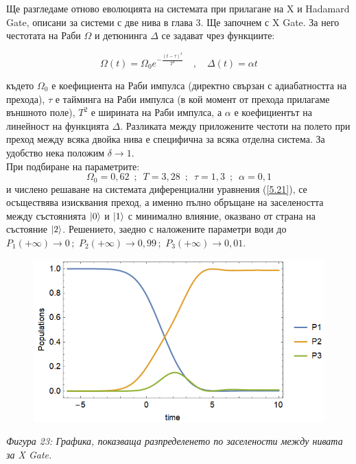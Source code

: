     Ще разгледаме отново еволюцията на системата при прилагане на X и Hadamard Gate, описани за системи с две нива в глава 3. Ще започнем с X Gate. За него честотата на Раби $\Omega$ и
    детюнинга $\Delta$ се задават чрез функциите:

    \begin{equation} \label{5.22}
        \Omega(t) = \Omega_0 e^{-\frac{(t-\tau)^2}{T^2}} \quad , \quad \Delta(t) = \alpha t
    \end{equation}

    където $\Omega_0$ е коефициента на Раби импулса (директно свързан с адиабатността на прехода), $\tau$ е тайминга на Раби импулса (в кой момент от прехода прилагаме
    външното поле), $T^2$ е ширината на Раби импулса, а $\alpha$ е коефициентът на линейност на функцията $\Delta$. Разликата между приложените честоти на полето
    при преход между всяка двойка нива е специфична за всяка отделна система. За удобство нека положим $\delta \rightarrow 1$.\\
    При подбиране на параметрите:
    \begin{equation} \label{5.23}
        \Omega_0 = 0,62 \,\,\, ; \,\,\, T = 3,28 \,\,\, ; \,\,\, \tau = 1,3 \,\,\, ; \,\,\, \alpha = 0,1
    \end{equation}
    и числено решаване на системата диференциални уравнения (\ref{5.21}), се осъществява изисквания преход, а именно пълно обръщане на заселеността между състоянията $\ket{0}$ и $\ket{1}$ с минимално влияние, оказвано от страна на състояние $\ket{2}$.
    Решението, заедно с наложените параметри води до $P_1(+\infty) \rightarrow 0 \, ;\,\, P_2(+\infty) \rightarrow 0,99 \, ;\,\, P_3(+\infty) \rightarrow 0,01$.

    \begin{figure}[H]
        \centering
        \includegraphics[width=370pt]{23.png}
    \end{figure}
    \begin{center}
        \small \textit{Фигура 23: Графика, показваща разпределенето по заселености между нивата за X Gate.}\\
    \end{center}

